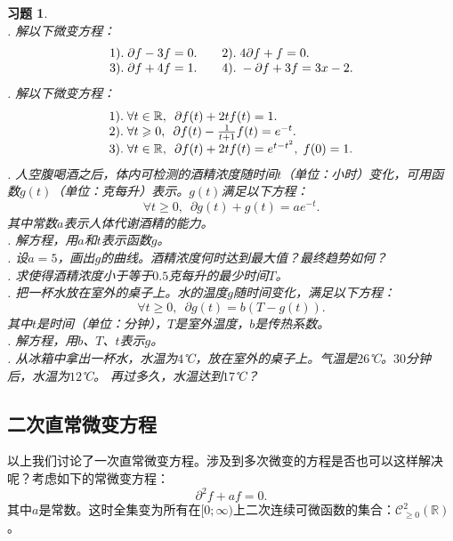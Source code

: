 \documentclass[12pt,UTF8]{ctexbook}
\theoremstyle{definition}
\theoremstyle{plain}
\newtheorem{xt}{习题}[section]
\begin{document}
\begin{xt}
    \mbox{} \\
    . 解以下微变方程：\\
    $$
    \begin{array}[]{ll}
        1).\;\partial f - 3 f = 0. &\quad2).\; 4\partial f + f = 0. \\
        3).\;\partial f + 4 f = 1. &\quad4).\; -\partial f + 3 f = 3x - 2. 
    \end{array}
    $$
    . 解以下微变方程：\\
    $$
    \begin{array}[]{l}
        1).\;\forall t\in \mathbb{R},\,\,\,\partial f(t) + 2 t f(t) = 1. \\
        2).\;\forall t \geqslant 0,\,\,\,\partial f(t) - \frac{1}{t + 1} f(t) = e^{-t}. \\
        3).\;\forall t\in \mathbb{R},\,\,\,\partial f(t) + 2t f(t) =e^{t - t^2}, \; f(0) = 1. 
    \end{array}
    $$
    . 人空腹喝酒之后，体内可检测的酒精浓度随时间$t$（单位：小时）变化，可用函数$g(t)$（单位：克每升）表示。$g(t)$满足以下方程：
    $$ \forall t\geqslant 0,\,\,\,\partial g(t) + g(t) = a e^{-t}.$$
    其中常数$a$表示人体代谢酒精的能力。\\
    . 解方程，用$a$和$t$表示函数$g$。\\
    . 设$a = 5$，画出$g$的曲线。酒精浓度何时达到最大值？最终趋势如何？\\
    . 求使得酒精浓度小于等于$0.5$克每升的最少时间$T$。\\
    . 把一杯水放在室外的桌子上。水的温度$g$随时间变化，满足以下方程：
    $$ \forall t\geqslant 0,\,\,\,\partial g(t) = b(T - g(t)).$$
    其中$t$是时间（单位：分钟），$T$是室外温度，$b$是传热系数。\\
    . 解方程，用$b$、$T$、$t$表示$g$。\\
    . 从冰箱中拿出一杯水，水温为$4$℃，放在室外的桌子上。气温是$26$℃。$30$分钟后，水温为$12$℃。
    再过多久，水温达到$17$℃？
\end{xt}

\subsection{二次直常微变方程}
以上我们讨论了一次直常微变方程。涉及到多次微变的方程是否也可以这样解决呢？考虑如下的常微变方程：
\begin{equation}
    \partial^2 f + a f = 0. \label{2-2d}
\end{equation}
其中$a$是常数。这时全集变为所有在$[0;\infty)$上二次连续可微函数的集合：$\mathcal{C}^2_{\geqslant 0}(\mathbb{R})$。
\end{document}

